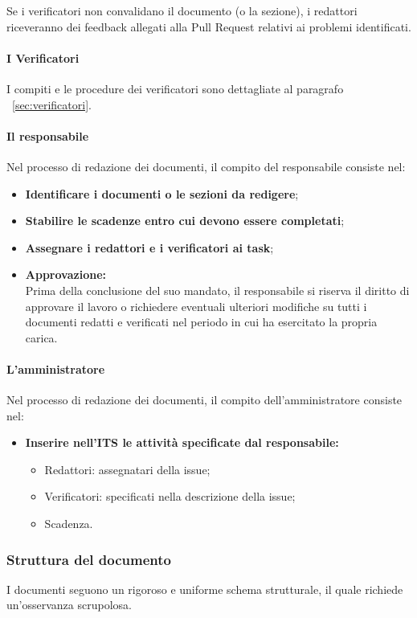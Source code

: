 Se i verificatori non convalidano il documento (o la sezione), i redattori riceveranno dei feedback allegati alla Pull Request relativi ai problemi identificati.

\paragraph{I Verificatori}
I compiti e le procedure dei verificatori sono dettagliate al paragrafo ~\ref{sec:verificatori}.

\paragraph{Il responsabile}
Nel processo di redazione dei documenti, il compito del responsabile consiste nel:
\begin{itemize}
    \item \textbf{Identificare i documenti o le sezioni da redigere};
    \item \textbf{Stabilire le scadenze entro cui devono essere completati};
    \item \textbf{Assegnare i redattori e i verificatori ai task};
    \item \textbf{Approvazione:} \\
    Prima della conclusione del suo mandato, il responsabile si riserva il diritto di approvare il lavoro o richiedere eventuali ulteriori modifiche su tutti i documenti redatti e verificati nel periodo in cui ha esercitato la propria carica.
\end{itemize}

\paragraph{L'amministratore}
Nel processo di redazione dei documenti, il compito dell'amministratore consiste nel:
\begin{itemize}
    \item \textbf{Inserire nell'ITS le attività specificate dal responsabile:}
    \begin{itemize}
              \item Redattori: assegnatari della issue;
              \item Verificatori: specificati nella descrizione della issue;
              \item Scadenza.
          \end{itemize}
\end{itemize}

\subsubsection{Struttura del documento}
\label{subsubsec:strutturadocumento}
I documenti seguono un rigoroso e uniforme schema strutturale, il quale richiede un'osservanza scrupolosa.

